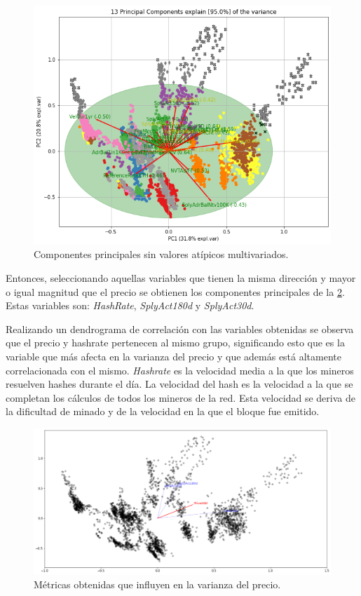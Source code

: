 \begin{figure}
	\centering
	\includegraphics[scale=0.6]{Chapter5/pca_sin_va_atipi.png}
	\caption{Componentes principales sin valores atípicos multivariados.}
	\label{fig13}
\end{figure}

Entonces, seleccionando aquellas variables que tienen la misma dirección y mayor o igual magnitud que el precio se obtienen los componentes principales de la \cref{fig14}. Estas variables son: \textit{HashRate}, \textit{SplyAct180d} y \textit{SplyAct30d}. 

Realizando un dendrograma de correlación con las variables obtenidas se observa que el precio y hashrate pertenecen al mismo grupo, significando esto que es la variable que más afecta en la varianza del precio y que además está altamente correlacionada con el mismo. \textit{Hashrate} es la velocidad media a la que los mineros resuelven hashes durante el día. La velocidad del hash es la velocidad a la que se completan los cálculos de todos los mineros de la red. Esta velocidad se deriva de la dificultad de minado y de la velocidad en la que el bloque fue emitido. 

\begin{figure}
	\centering
	\includegraphics[scale=0.4]{Chapter5/pca_price.png}
	\caption{Métricas obtenidas que influyen en la varianza del precio.}
	\label{fig14}
\end{figure}

